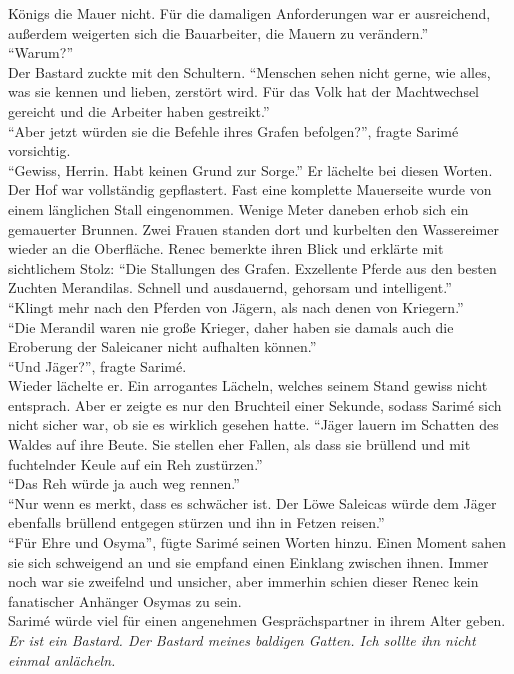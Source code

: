 Königs die Mauer nicht. Für die damaligen Anforderungen war er ausreichend, außerdem weigerten sich 
die Bauarbeiter, die Mauern zu verändern.''\\
``Warum?''\\
Der Bastard zuckte mit den Schultern. ``Menschen sehen nicht gerne, wie alles, was sie kennen und 
lieben, zerstört wird. Für das Volk hat der Machtwechsel gereicht und die Arbeiter haben 
gestreikt.''\\
``Aber jetzt würden sie die Befehle ihres Grafen befolgen?'', fragte Sarimé vorsichtig.\\
``Gewiss, Herrin. Habt keinen Grund zur Sorge.'' Er lächelte bei diesen Worten.\\
Der Hof war vollständig gepflastert. Fast eine komplette Mauerseite wurde von einem länglichen 
Stall eingenommen. Wenige Meter daneben erhob sich ein gemauerter Brunnen. Zwei Frauen standen dort 
und kurbelten den Wassereimer wieder an die Oberfläche. Renec bemerkte ihren Blick und erklärte mit 
sichtlichem Stolz: ``Die Stallungen des Grafen. Exzellente Pferde aus den besten Zuchten 
Merandilas. Schnell und ausdauernd, gehorsam und intelligent.''\\
``Klingt mehr nach den Pferden von Jägern, als nach denen von Kriegern.''\\
``Die Merandil waren nie große Krieger, daher haben sie damals auch die Eroberung der Saleicaner 
nicht aufhalten können.''\\
``Und Jäger?'', fragte Sarimé.\\
Wieder lächelte er. Ein arrogantes Lächeln, welches seinem Stand gewiss nicht entsprach. Aber er 
zeigte es nur den Bruchteil einer Sekunde, sodass Sarimé sich nicht sicher war, ob sie es wirklich 
gesehen hatte. 
``Jäger lauern im Schatten des Waldes auf ihre Beute. Sie stellen eher Fallen, als dass sie 
brüllend und mit fuchtelnder Keule auf ein Reh zustürzen.''\\
``Das Reh würde ja auch weg rennen.''\\
``Nur wenn es merkt, dass es schwächer ist. Der Löwe Saleicas würde dem Jäger ebenfalls brüllend 
entgegen stürzen und ihn in Fetzen reisen.''\\
``Für Ehre und Osyma'', fügte Sarimé seinen Worten hinzu. Einen Moment sahen sie sich schweigend an 
und sie empfand einen Einklang zwischen ihnen. Immer noch war sie zweifelnd und unsicher, aber 
immerhin schien dieser Renec kein fanatischer Anhänger Osymas zu sein. \\
Sarimé würde viel für einen angenehmen Gesprächspartner in ihrem Alter geben. \textit{Er ist ein 
Bastard. Der Bastard meines baldigen Gatten. Ich sollte ihn nicht einmal anlächeln.}\\
